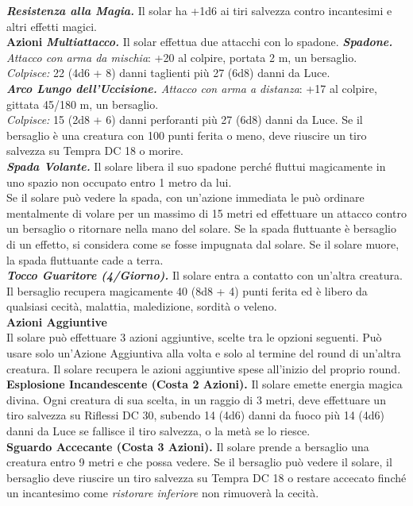 \begin{multicols}{2}
\emph{\textbf{Resistenza alla Magia.}} Il solar ha +1d6 ai tiri salvezza contro incantesimi e altri effetti magici.\\
\smallskip\textbf{Azioni}
\emph{\textbf{Multiattacco.}} Il solar effettua due attacchi con lo spadone.
\emph{\textbf{Spadone.} Attacco con arma da mischia}: +20 al colpire, portata 2 m, un bersaglio.\\
\emph{Colpisce:} 22 (4d6 + 8) danni taglienti più 27 (6d8) danni da Luce.\\
\emph{\textbf{Arco Lungo dell'Uccisione.} Attacco con arma a distanza}: +17 al colpire, gittata 45/180 m, un bersaglio.\\
\emph{Colpisce:} 15 (2d8 + 6) danni perforanti più 27 (6d8) danni da Luce. Se il bersaglio è una creatura con 100 punti ferita o meno, deve riuscire un tiro salvezza su Tempra DC  18 o morire. \\
\emph{\textbf{Spada Volante.}} Il solare libera il suo spadone perché fluttui magicamente in uno spazio non occupato entro 1 metro da lui.\\
Se il solare può vedere la spada, con un'azione immediata le può ordinare mentalmente di volare per un massimo di 15 metri ed effettuare un attacco contro un bersaglio o ritornare nella mano del solare. Se la spada fluttuante è bersaglio di un effetto, si considera come se fosse impugnata dal solare. Se il solare muore, la spada fluttuante cade a terra.\\
\emph{\textbf{Tocco Guaritore (4/Giorno).}} Il solare entra a contatto con  un'altra creatura. Il bersaglio recupera magicamente 40 (8d8 + 4) punti ferita ed è libero da qualsiasi cecità, malattia, maledizione, sordità o veleno.\\
\textbf{Azioni Aggiuntive}\\
Il solare può effettuare 3 azioni aggiuntive, scelte tra le opzioni seguenti. Può usare solo un'Azione Aggiuntiva alla volta e solo al termine del round di un'altra creatura. Il solare recupera le azioni aggiuntive spese all'inizio del proprio round. \\
\textbf{Esplosione Incandescente (Costa 2 Azioni).} Il solare emette energia magica divina. Ogni creatura di sua scelta, in un raggio di 3 metri, deve effettuare un tiro salvezza su Riflessi DC  30, subendo 14 (4d6) danni da fuoco più 14 (4d6) danni da Luce se fallisce il tiro salvezza, o la metà se lo riesce. \\ 
\textbf{Sguardo Accecante (Costa 3 Azioni).} Il solare prende a bersaglio una creatura entro 9 metri e che possa vedere. Se il bersaglio può vedere il solare, il bersaglio deve riuscire un tiro salvezza su Tempra DC  18 o restare accecato finché un incantesimo come \emph{ristorare inferiore} non rimuoverà la cecità.\\

\end{multicols}
